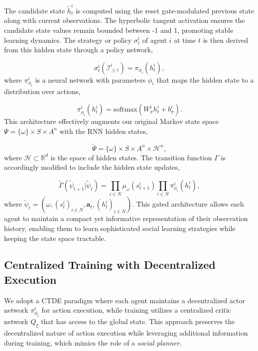 The candidate state $\tilde{h}_t^i$ is computed using the reset gate-modulated previous state along with current observations. The hyperbolic tangent activation ensures the candidate state values remain bounded between -1 and 1, promoting stable learning dynamics. The strategy or policy $\sigma_t^i$ of agent $i$ at time $t$ is then derived from this hidden state through a policy network,

\begin{equation*}
\sigma_t^i(\mathcal{I}_{\leq t}^i) = \pi_{\phi_i}(h_t^i),
\end{equation*}
where $\pi^i_{\phi_i}$ is a neural network with parameters $\phi_i$ that maps the hidden state to a distribution over actions,

\begin{equation*}
    \pi^i_{\phi_i}(h^i_t) = \text{softmax}(W^i_{\pi}h^i_t + b^i_{\pi}).
\end{equation*}
This architecture effectively augments our original Markov state space $\Psi = \{\omega\} \times S \times A^n$ with the RNN hidden states,

\begin{equation*}
    \tilde{\Psi} = \{\omega\} \times S \times A^n \times \mathcal{H}^n,
\end{equation*}
where $\mathcal{H} \subset \mathbb{R}^d$ is the space of hidden states. The transition function $\Gamma$ is accordingly modified to include the hidden state updates,

\begin{equation*}
    \tilde{\Gamma}(\tilde{\psi}_{t+1}|\tilde{\psi}_t) = \prod_{i \in N} \mu_\omega(s^i_{t+1}) \prod_{i \in N} \pi^i_{\phi_i}(h^i_t),
\end{equation*}
where $\tilde{\psi}_t = (\omega, (s^i_t)_{i \in N}, \mathbf{a}_t, (h^i_t)_{i \in N})$. This gated architecture allows each agent to maintain a compact yet informative representation of their observation history, enabling them to learn sophisticated social learning strategies while keeping the state space tractable.

\subsection*{Centralized Training with Decentralized Execution}
We adopt a CTDE paradigm where each agent maintains a decentralized actor network $\pi^i_{\phi_i}$ for action execution, while training utilizes a centralized critic network $Q_{\xi}$ that has access to the global state. This approach preserves the decentralized nature of action execution while leveraging additional information during training, which mimics the role of a \textit{social planner.}

